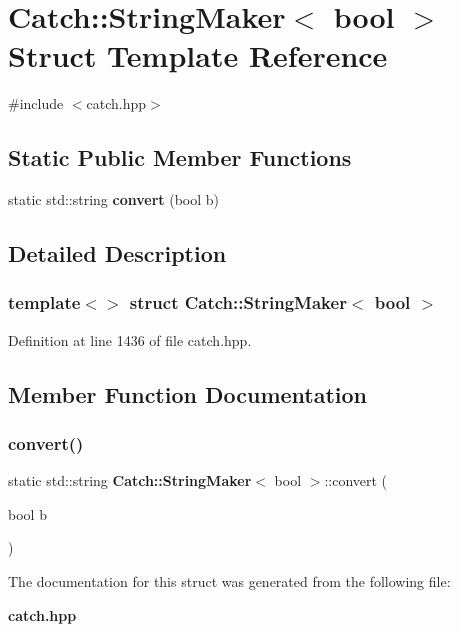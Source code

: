 \section{Catch\+::String\+Maker$<$ bool $>$ Struct Template Reference}
\label{struct_catch_1_1_string_maker_3_01bool_01_4}


{\ttfamily \#include $<$catch.\+hpp$>$}

\subsection*{Static Public Member Functions}
\begin{DoxyCompactItemize}
\item 
static std\+::string \textbf{ convert} (bool b)
\end{DoxyCompactItemize}


\subsection{Detailed Description}
\subsubsection*{template$<$$>$\newline
struct Catch\+::\+String\+Maker$<$ bool $>$}



Definition at line 1436 of file catch.\+hpp.



\subsection{Member Function Documentation}
\mbox{\label{struct_catch_1_1_string_maker_3_01bool_01_4_a37e9899c82c4b4515f876f16f8957a77}} 
\subsubsection{convert()}
{\footnotesize\ttfamily static std\+::string \textbf{ Catch\+::\+String\+Maker}$<$ bool $>$\+::convert (\begin{DoxyParamCaption}\item[{bool}]{b }\end{DoxyParamCaption})\hspace{0.3cm}{\ttfamily [static]}}



The documentation for this struct was generated from the following file\+:\begin{DoxyCompactItemize}
\item 
\textbf{ catch.\+hpp}\end{DoxyCompactItemize}
